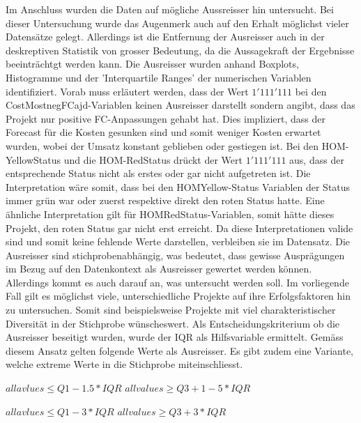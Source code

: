 \newline Im Anschluss wurden die Daten auf mögliche Aussreisser hin untersucht. Bei dieser Untersuchung wurde das Augenmerk auch auf den Erhalt möglichst vieler Datensätze gelegt. Allerdings ist die Entfernung der Ausreisser auch in der deskreptiven Statistik von grosser Bedeutung, da die Aussagekraft der Ergebnisse beeinträchtgt werden kann. Die Ausreisser wurden anhand Boxplots, Histogramme und der 'Interquartile Ranges' der numerischen Variablen identifiziert.  Vorab muss erläutert werden, dass der Wert $1'111'111$ bei den CostMostnegFCajd-Variablen keinen Ausreisser darstellt sondern angibt, dass das Projekt nur positive FC-Anpassungen gehabt hat. Dies impliziert, dass der Forecast für die Kosten gesunken sind und somit weniger Kosten erwartet wurden, wobei der Umsatz konstant geblieben oder gestiegen ist. Bei den HOM-YellowStatus und die HOM-RedStatus drückt der Wert $1'111'111$ aus, dass der entsprechende Status nicht als erstes oder gar nicht aufgetreten ist. Die Interpretation wäre somit, dass bei den HOMYellow-Status Variablen der Status immer grün war oder zuerst respektive direkt den roten Status hatte. Eine ähnliche Interpretation gilt für HOMRedStatus-Variablen, somit hätte dieses Projekt, den roten Status gar nicht erst erreicht. Da diese Interpretationen valide sind und somit keine fehlende Werte darstellen, verbleiben sie im Datensatz. 
\newline
Die Ausreisser sind stichprobenabhängig, was bedeutet, dass gewisse Ausprägungen im Bezug auf den Datenkontext als Ausreisser gewertet werden können. Allerdings kommt es auch darauf an, was untersucht werden soll. Im vorliegende Fall gilt es möglichst viele, unterschiedliche Projekte auf ihre Erfolgsfaktoren hin zu untersuchen. Somit sind beispielsweise Projekte mit viel charakteristischer Diversität in der Stichprobe wünscheswert. Als Entscheidungskriterium ob die Ausreisser beseitigt wurden, wurde der IQR als Hilfsvariable ermittelt. Gemäss diesem Ansatz gelten folgende Werte als Ausreisser. Es gibt zudem eine Variante, welche extreme Werte in die Stichprobe miteinschliesst.
\newline\newline
\begin{centering}
		$ all avlues \leq Q1 - 1.5 * IQR$
		\newline
		$ all values \geq Q3 + 1-5 * IQR$
\end{centering}
\newline
\newline
\begin{centering}
		$ all avlues \leq Q1 - 3 * IQR$
		\newline
		$ all values \geq Q3 + 3 * IQR$
\end{centering}
